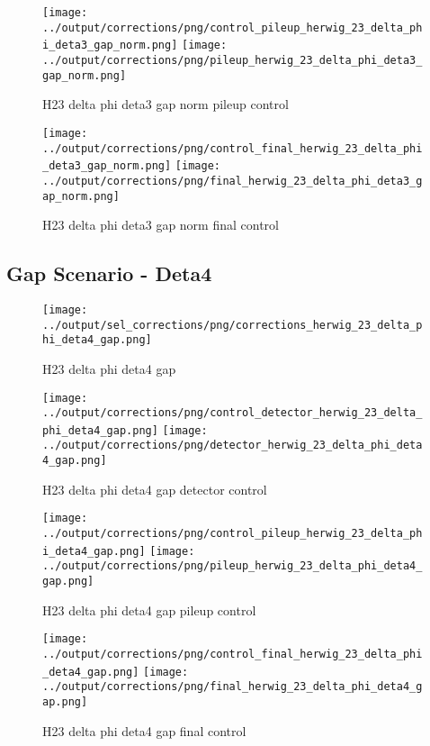 \documentclass[11pt]{book}
\begin{document}
\begin{figure}[ht]
\centering
\texttt{[image: ../output/corrections/png/control\_pileup\_herwig\_23\_delta\_phi\_deta3\_gap\_norm.png]}
\texttt{[image: ../output/corrections/png/pileup\_herwig\_23\_delta\_phi\_deta3\_gap\_norm.png]}
\caption{H23 delta phi deta3 gap norm pileup control}
\label{fig:H23_delta_phi_deta3_gap_norm_pileup_control}
\end{figure}


\begin{figure}[ht]
\centering
\texttt{[image: ../output/corrections/png/control\_final\_herwig\_23\_delta\_phi\_deta3\_gap\_norm.png]}
\texttt{[image: ../output/corrections/png/final\_herwig\_23\_delta\_phi\_deta3\_gap\_norm.png]}
\caption{H23 delta phi deta3 gap norm final control}
\label{fig:H23_delta_phi_deta3_gap_norm_final_control}
\end{figure}



\clearpage
\subsection{Gap Scenario - Deta4}
\begin{figure}[ht]
\centering
\texttt{[image: ../output/sel\_corrections/png/corrections\_herwig\_23\_delta\_phi\_deta4\_gap.png]}
\caption{H23 delta phi deta4 gap}
\label{fig:H23_delta_phi_deta4_gap}
\end{figure}

\begin{figure}[ht]
\centering
\texttt{[image: ../output/corrections/png/control\_detector\_herwig\_23\_delta\_phi\_deta4\_gap.png]}
\texttt{[image: ../output/corrections/png/detector\_herwig\_23\_delta\_phi\_deta4\_gap.png]}
\caption{H23 delta phi deta4 gap detector control}
\label{fig:H23_delta_phi_deta4_gap_detector_control}
\end{figure}

\begin{figure}[ht]
\centering
\texttt{[image: ../output/corrections/png/control\_pileup\_herwig\_23\_delta\_phi\_deta4\_gap.png]}
\texttt{[image: ../output/corrections/png/pileup\_herwig\_23\_delta\_phi\_deta4\_gap.png]}
\caption{H23 delta phi deta4 gap pileup control}
\label{fig:H23_delta_phi_deta4_gap_pileup_control}
\end{figure}


\begin{figure}[ht]
\centering
\texttt{[image: ../output/corrections/png/control\_final\_herwig\_23\_delta\_phi\_deta4\_gap.png]}
\texttt{[image: ../output/corrections/png/final\_herwig\_23\_delta\_phi\_deta4\_gap.png]}
\caption{H23 delta phi deta4 gap final control}
\label{fig:H23_delta_phi_deta4_gap_final_control}
\end{figure}
\end{document}
